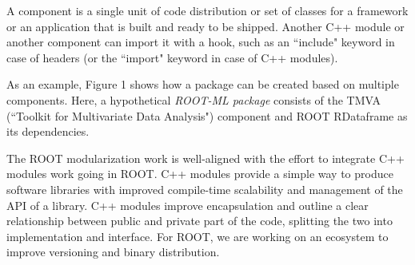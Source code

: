 \documentclass{webofc}
\begin{document}
A component is a single unit of code distribution or set of classes for a framework or an application that is built and ready to be shipped. Another C++ module \cite{cxxmodules} or another component can import it with a hook, such as an ``include" keyword in case of headers (or the ``import" keyword in case of C++ modules).




As an example, Figure 1 shows how a package can be created based on multiple components. Here, a hypothetical \textit{ROOT-ML package} consists of the TMVA (``Toolkit for Multivariate Data Analysis") component and ROOT RDataframe as its dependencies.

The ROOT modularization work is well-aligned with the effort to integrate C++ modules work going \cite{rootcxxmodules} in ROOT. C++ modules provide a simple way to produce software libraries with improved compile-time scalability and management of the API of a library. C++ modules improve encapsulation and outline a clear relationship between public and private part of the code, splitting the two into implementation and interface.
For ROOT, we are working on an ecosystem to improve versioning and binary distribution.
\end{document}
